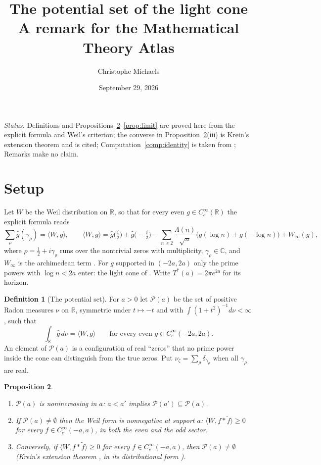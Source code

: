 \documentclass[11pt]{article}
\title{The potential set of the light cone\\ \large A remark for the Mathematical Theory Atlas}
\author{Christophe Michaels}
\date{September 29, 2026}
\newtheorem{proposition}{Proposition}
\theoremstyle{definition}
\newtheorem{definition}[proposition]{Definition}
\theoremstyle{remark}
\newcommand{\R}{\mathbb{R}}
\newcommand{\C}{\mathbb{C}}
\begin{document}
\maketitle

\noindent\emph{Status.} Definitions and Propositions~\ref{prop:basic}--\ref{prop:limit} are proved here from the explicit formula and Weil's criterion; the converse in Proposition~\ref{prop:basic}(iii) is Krein's extension theorem and is cited; Computation~\ref{comp:identity} is taken from \cite[Table 1]{folds}; Remarks make no claim.

\section*{Setup}
Let $W$ be the Weil distribution on $\R$, so that for every even $g\in C_c^\infty(\R)$ the explicit formula reads
\begin{equation}\label{eq:explicit}
\sum_\rho\widehat g(\gamma_\rho)=\langle W,g\rangle,\qquad
\langle W,g\rangle=\widehat g\big(\tfrac i2\big)+\widehat g\big(-\tfrac i2\big)-\sum_{n\ge2}\frac{\Lambda(n)}{\sqrt n}\big(g(\log n)+g(-\log n)\big)+W_\infty(g),
\end{equation}
where $\rho=\frac12+i\gamma_\rho$ runs over the nontrivial zeros with multiplicity, $\gamma_\rho\in\C$, and $W_\infty$ is the archimedean term \cite{weil,folds}. For $g$ supported in $(-2a,2a)$ only the prime powers with $\log n<2a$ enter: the light cone of \cite[\S12]{folds}. Write $T^*(a)=2\pi e^{2a}$ for its horizon.

\begin{definition}[The potential set]\label{def:P}
For $a>0$ let $\mathcal P(a)$ be the set of positive Radon measures $\nu$ on $\R$, symmetric under $t\mapsto-t$ and with $\int(1+t^2)^{-1}d\nu<\infty$, such that
\begin{equation}\label{eq:agree}
\int_\R\widehat g\,d\nu=\langle W,g\rangle\qquad\text{for every even } g\in C_c^\infty(-2a,2a).
\end{equation}
An element of $\mathcal P(a)$ is a configuration of real ``zeros'' that no prime power inside the cone can distinguish from the true zeros. Put $\nu_\zeta=\sum_\rho\delta_{\gamma_\rho}$ when all $\gamma_\rho$ are real.
\end{definition}

\begin{proposition}\label{prop:basic}
\begin{enumerate}
\item[(i)] $\mathcal P(a)$ is nonincreasing in $a$: $a<a'$ implies $\mathcal P(a')\subseteq\mathcal P(a)$.
\item[(ii)] If $\mathcal P(a)\neq\emptyset$ then the Weil form is nonnegative at support $a$: $\langle W,f*\tilde f\rangle\ge0$ for every $f\in C_c^\infty(-a,a)$, in both the even and the odd sector.
\item[(iii)] Conversely, if $\langle W,f*\tilde f\rangle\ge0$ for every $f\in C_c^\infty(-a,a)$, then $\mathcal P(a)\neq\emptyset$ (Krein's extension theorem \cite{krein}, in its distributional form \cite{jpt}).
\end{enumerate}
\end{proposition}
\end{document}
